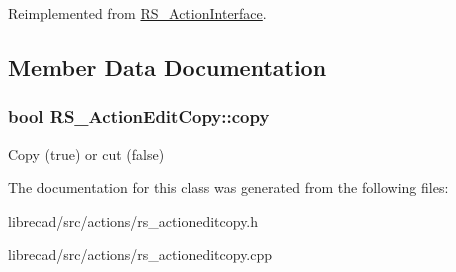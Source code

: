 Reimplemented from \hyperlink{classRS__ActionInterface_a25ec66468e5b09483afccd2358877361}{R\-S\-\_\-\-Action\-Interface}.



\subsection{Member Data Documentation}
\hypertarget{classRS__ActionEditCopy_a7f5523b31820f2ed72a3570a5cedad98}{
\subsubsection[{copy}]{\setlength{\rightskip}{0pt plus 5cm}bool R\-S\-\_\-\-Action\-Edit\-Copy\-::copy\hspace{0.3cm}{\ttfamily [protected]}}}\label{classRS__ActionEditCopy_a7f5523b31820f2ed72a3570a5cedad98}
Copy (true) or cut (false) 

The documentation for this class was generated from the following files\-:\begin{DoxyCompactItemize}
\item 
librecad/src/actions/rs\-\_\-actioneditcopy.\-h\item 
librecad/src/actions/rs\-\_\-actioneditcopy.\-cpp\end{DoxyCompactItemize}
